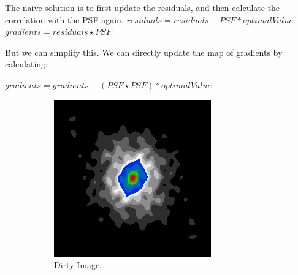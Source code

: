 The naive solution is to first update the residuals, and then calculate the correlation with the PSF again.
$residuals = residuals - PSF * optimalValue$
$gradients = residuals \star PSF$


But we can simplify this. We can directly update the map of gradients by calculating:

$gradients = gradients - (PSF \star PSF) * optimalValue$

\begin{figure}[h]
	\centering
	\begin{subfigure}[b]{0.3\linewidth}
		\includegraphics[width=\linewidth]{./chapters/03.distribution/simulated/psf.png}
		\caption{Dirty Image.}
		\label{cd:efficient:update:dirty}
	\end{subfigure}
	\begin{subfigure}[b]{0.3\linewidth}

\end{subfigure}
\end{figure}
